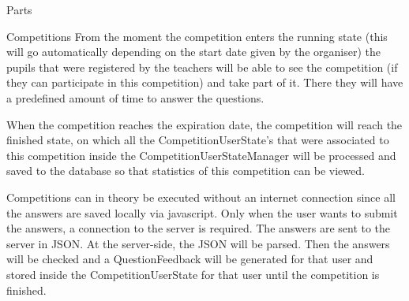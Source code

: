 \documentclass[]{article}
\begin{document}
\begin{section}{Parts}
\begin{subsection}{Competitions}
        From the moment the competition enters the running state (this will go
        automatically depending on the start date given by the organiser) the pupils
        that were registered by the teachers will be able to see the competition (if they can 
        participate in this competition) and take part of it. There they will have a predefined 
        amount of time to answer the questions.
        
        When the competition reaches the expiration date, the competition will reach the
        finished state, on which all the CompetitionUserState's that were associated to
        this competition inside the CompetitionUserStateManager will be processed and
        saved to the database so that statistics of this competition can be viewed.
        
        Competitions can in theory be executed without an internet connection since
        all the answers are saved locally via javascript. Only when the user wants to submit
        the answers, a connection to the server is required. The answers are sent to the
        server in JSON. At the server-side, the JSON will be parsed. Then the answers will
        be checked and a QuestionFeedback will be generated for that user and stored inside
        the CompetitionUserState for that user until the competition is finished.
        

\end{subsection}
\end{section}
\end{document}
